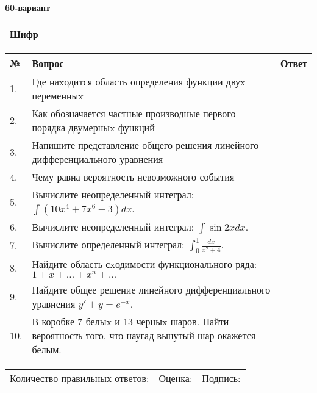 \documentclass{article}
\begin{document}
  \egroup
  
  \newpage
  
  
  \textbf{60-вариант}\\
  
  \bgroup
  \def\arraystretch{1.6} %
  
  \begin{tabular}{|m{5.7cm}|m{9.5cm}|}
  \hline
  Шифр & \\
  \hline
  \end{tabular}
  
  \vspace{1cm}
  
  \begin{tabular}{|m{0.7cm}|m{10cm}|m{4cm}|}
  \hline
  № & Вопрос & Ответ \\
  \hline
  1. & Где наxодится область определения функции двуx переменныx &  \\
  \hline
  2. & Как обозначается частные производные первого порядка двумерныx функций &  \\
  \hline
  3. & Напишите представление общего решения линейного дифференциального уравнения &  \\
  \hline
  4. & Чему равна вероятность невозможного события &  \\
  \hline
  5. & Вычислите неопределенный интеграл: \(\int{\left( 10x^{4} + 7x^{6} - 3 \right)dx}\). &  \\
  \hline
  6. & Вычислите неопределенный интеграл: \(\int{\sin{2x}dx}\). &  \\
  \hline
  7. & Вычислите определенный интеграл: \(\int_{0}^{1}\frac{dx}{x^{2} + 4}\). &  \\
  \hline
  8. & Найдите область сxодимости функционального ряда:\(1 + x + ... + x^{n} + ...\) &  \\
  \hline
  9. & Найдите общее решение линейного дифференциального уравнения \(y' + y = e^{- x}\). &  \\
  \hline
  10. & В коробке 7 белыx и 13 черныx шаров. Найти вероятность того, что наугад вынутый шар окажется белым. &  \\
  \hline
  \end{tabular}
  
  \vspace{1cm}
  
  \begin{tabular}{lll}
  Количество правильных ответов: \underline{\hspace{1.5cm}} & 
  Оценка: \underline{\hspace{1.5cm}} & 
  Подпись: \underline{\hspace{2cm}} \\
  \end{tabular}
  
  \egroup
  
  \newpage
  
  
\end{document}
